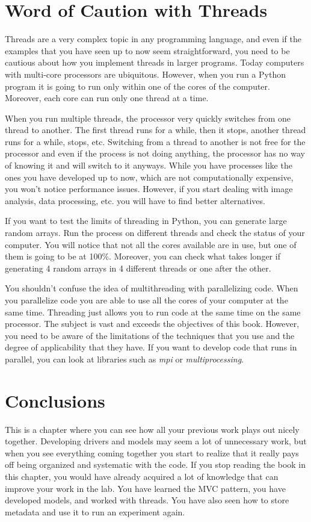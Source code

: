 \section{Word of Caution with Threads}\label{word-of-caution-withthreads}

Threads are a very complex topic in any programming language, and even
if the examples that you have seen up to now seem straightforward, you
need to be cautious about how you implement threads in larger programs.
Today computers with multi-core processors are ubiquitous. However, when
you run a Python program it is going to run only within one of the cores
of the computer. Moreover, each core can run only one thread at a time.

When you run multiple threads, the processor very quickly switches from
one thread to another. The first thread runs for a while, then it stops,
another thread runs for a while, stops, etc. Switching from a thread to
another is not free for the processor and even if the process is not
doing anything, the processor has no way of knowing it and will switch
to it anyways. While you have processes like the ones you have developed
up to now, which are not computationally expensive, you won't notice
performance issues. However, if you start dealing with image analysis,
data processing, etc. you will have to find better alternatives.

If you want to test the limits of threading in Python, you can generate
large random arrays. Run the process on different threads and check the
status of your computer. You will notice that not all the cores
available are in use, but one of them is going to be at 100\%. Moreover,
you can check what takes longer if generating 4 random arrays in 4
different threads or one after the other.

You shouldn't confuse the idea of multithreading with parallelizing
code. When you parallelize code you are able to use all the cores of
your computer at the same time. Threading just allows you to run code at
the same time on the same processor. The subject is vast and exceeds the
objectives of this book. However, you need to be aware of the
limitations of the techniques that you use and the degree of
applicability that they have. If you want to develop code that runs in
parallel, you can look at libraries such as \emph{mpi} or
\emph{multiprocessing}.

\section{Conclusions}\label{conclusions}
This is a chapter where you can see how all your previous work plays out
nicely together. Developing drivers and models may seem a lot of
unnecessary work, but when you see everything coming together you start
to realize that it really pays off being organized and systematic with
the code. If you stop reading the book in this chapter, you would have
already acquired a lot of knowledge that can improve your work in the
lab. You have learned the {MVC} pattern, you have developed models, and
worked with threads. You have also seen how to store metadata and use it
to run an experiment again.

